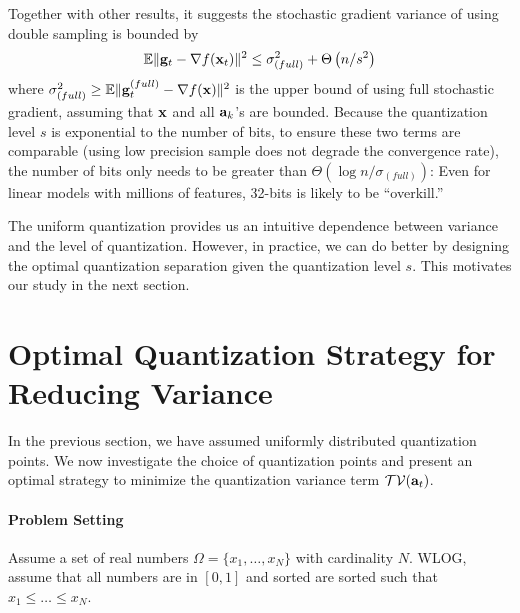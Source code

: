 \documentclass{article}
\def\a{{\bf a}}
\def\g{{\bf g}}
\def\x{{\bf x}}
\def\E{\mathbb{E}}
\begin{document}
\vspace{-1em}
Together with other results, it suggests the stochastic gradient variance of using double sampling is bounded by
\[
\E\|\g_t - \nabla f(\x_t)\|^2 \leq \sigma^2_{(full)} + \Theta \left( {n /s^2} \right)
\]
where $\sigma^2_{(full)} \geq \E \|\g_t^{(full)} - \nabla f(\x)\|^2$ is the upper bound of using full stochastic gradient, assuming that $\x$ and all $\a_k$'s are bounded. Because the quantization level $s$ is exponential to the number of bits, to ensure these two terms are comparable (using low precision sample does not degrade the convergence rate), the number of bits only needs to be greater than $\Theta (\log n /\sigma_{(full)})$: Even for linear models with millions
of features, 32-bits is likely to be  ``overkill.''

\vspace{-0.5em}
The uniform quantization provides us an intuitive dependence between variance and the level of quantization. However, in practice, we can do better by designing the optimal quantization separation given the quantization level $s$. This motivates
our study in the next section.





\vspace{-1em}
\section{Optimal Quantization Strategy for Reducing Variance} \label{sec:optimal}

\vspace{-0.5em}

In the previous section, we have assumed uniformly distributed quantization points.  
We now investigate the choice of quantization points and present an optimal strategy to minimize the quantization variance term $\mathcal{TV}(\a_t)$.

\vspace{-1em}
\paragraph*{Problem Setting}
Assume a set of real numbers $\Omega = \{x_1, \ldots, x_N\}$ with cardinality $N$. WLOG, assume that all numbers are in $[0, 1]$ and sorted are sorted such that $x_1 \leq \ldots \leq x_N$. 
\end{document}
